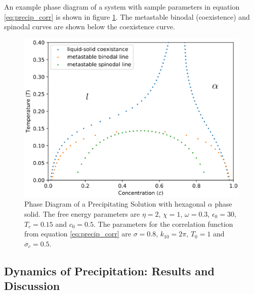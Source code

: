 \documentclass[showkeys, prb, reprint]{revtex4-1}
\begin{document}
An example phase diagram of a system with sample parameters in equation
\ref{eq:precip_corr} is shown in figure \ref{fig:precip_phase_dia}. The
metastable binodal (coexistence) and spinodal curves are shown below the
coexistence curve.

\begin{figure}
    \centering	
    \includegraphics[width=\columnwidth]{solution.eps}
    \caption[Coexistance Phase Diagram with Metastable Spinodal]{
        \label{fig:precip_phase_dia} Phase Diagram of a Precipitating Solution
        with hexagonal $\alpha$ phase solid. The free energy parameters are
        $\eta = 2$, $\chi = 1$, $\omega=0.3$, $\epsilon_0=30$, $T_c = 0.15$ and
        $c_0 = 0.5$. The parameters for the correlation function from equation
        \ref{eq:precip_corr} are $\sigma = 0.8$, $k_{10} = 2\pi$, $T_0 = 1$ and
        $\sigma_c = 0.5$.
    }
\end{figure}

\subsection{Dynamics of Precipitation: Results and Discussion} %

 
\end{document}
